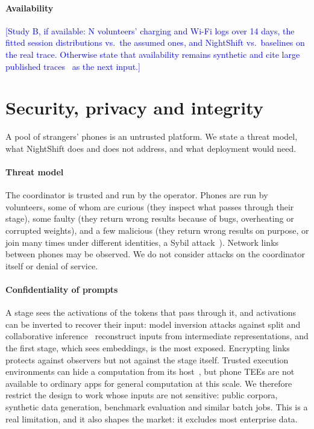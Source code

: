 \documentclass[preprint,review,12pt,authoryear]{elsarticle}
\newcommand{\Pending}[1]{\textcolor{blue}{[#1]}}
\begin{document}
\paragraph{Availability} \Pending{Study B, if available: N volunteers' charging
and Wi-Fi logs over 14 days, the fitted session distributions vs.\ the assumed
ones, and NightShift vs.\ baselines on the real trace. Otherwise state that
availability remains synthetic and cite large published
traces~\citep{yang2021heterogeneity} as the next input.}

\section{Security, privacy and integrity}
\label{sec:security}

A pool of strangers' phones is an untrusted platform. We state a threat model,
what NightShift does and does not address, and what deployment would need.

\paragraph{Threat model} The coordinator is trusted and run by the operator.
Phones are run by volunteers, some of whom are curious (they inspect what
passes through their stage), some faulty (they return wrong results because of
bugs, overheating or corrupted weights), and a few malicious (they return
wrong results on purpose, or join many times under different identities, a
Sybil attack~\citep{sybil}). Network links between phones may be observed. We
do not consider attacks on the coordinator itself or denial of service.

\paragraph{Confidentiality of prompts} A stage sees the activations of the
tokens that pass through it, and activations can be inverted to recover their
input: model inversion attacks against split and collaborative
inference~\citep{he2019inversion,splitlearning} reconstruct inputs from
intermediate representations, and the first stage, which sees embeddings, is
the most exposed. Encrypting links protects against observers but not against
the stage itself. Trusted execution environments can hide a computation from
its host~\citep{slalom}, but phone TEEs are not available to ordinary apps for
general computation at this scale. We therefore restrict the design to work
whose inputs are not sensitive: public corpora, synthetic data generation,
benchmark evaluation and similar batch jobs. This is a real limitation, and it
also shapes the market: it excludes most enterprise data.
\end{document}

